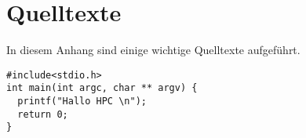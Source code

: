 \chapter{Quelltexte}

In diesem Anhang sind einige wichtige Quelltexte aufgeführt.

\begin{lstlisting}
#include<stdio.h>
int main(int argc, char ** argv) {
  printf("Hallo HPC \n");
  return 0;
}
\end{lstlisting}
